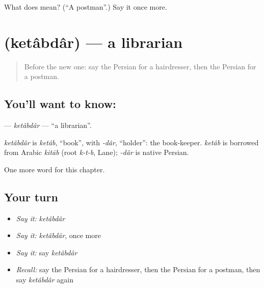 \begin{tcolorbox}[breakable,colback=teal!4,colframe=teal!35!black,title={Before you move on}]
What does  mean? (\textquotedblleft{}A postman\textquotedblright{}.) Say it once more.
\end{tcolorbox}
\section[\texorpdfstring{\fa{کتابدار} (ketâbdâr)}{کتابدار (ketâbdâr)}]{ (ketâbdâr) — a librarian}

\label{lesson:FA-C284-ketabdar}



\begin{quote}
Before the new one: say the Persian for a hairdresser, then the Persian for a postman.
\end{quote}

\subsection*{You'll want to know: }
\textbf{} — \emph{ketâbdâr} — \textquotedblleft{}a librarian\textquotedblright{}.

\begin{cousinweb}
\emph{ketâbdâr} is \emph{ketâb}, \textquotedblleft{}book\textquotedblright{}, with \emph{-dâr}, \textquotedblleft{}holder\textquotedblright{}: the book-keeper. \emph{ketâb} is borrowed from Arabic \emph{kitāb} (root \emph{k-t-b}, Lane); \emph{-dâr} is native Persian.
\end{cousinweb}

\begin{grammarlens}[title={What you've built}]
One more word for this chapter.
\end{grammarlens}

\subsection*{Your turn}
\begin{itemize}
\raggedright
  \item \emph{Say it:} \emph{ketâbdâr}
  \item \emph{Say it:} \emph{ketâbdâr}, once more
  \item \emph{Say it:} say \emph{ketâbdâr}
  \item \emph{Recall:} say the Persian for a hairdresser, then the Persian for a postman, then say \emph{ketâbdâr} again
\end{itemize}

